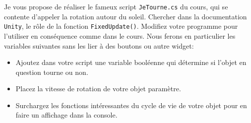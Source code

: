 \documentclass[a4paper,10pt]{article}
\begin{document}
Je vous propose de réaliser le fameux script \lstinline|JeTourne.cs| du cours, qui se contente d'appeler la rotation autour du soleil. Chercher dans la documentation \texttt{Unity}, le rôle de la fonction \lstinline|FixedUpdate()|. Modifiez votre programme pour l'utiliser en conséquence comme dans le cours. Nous ferons en particulier les variables suivantes sans les lier à des boutons ou autre widget:
\begin{itemize}
	\item Ajoutez dans votre script une variable booléenne qui détermine si l'objet en question tourne ou non.
	\item Placez la vitesse de rotation de votre objet  paramètre.
	\item Surchargez les fonctions intéressantes du cycle de vie de votre objet pour en faire un affichage dans la console. 
\end{itemize}
\end{document}
